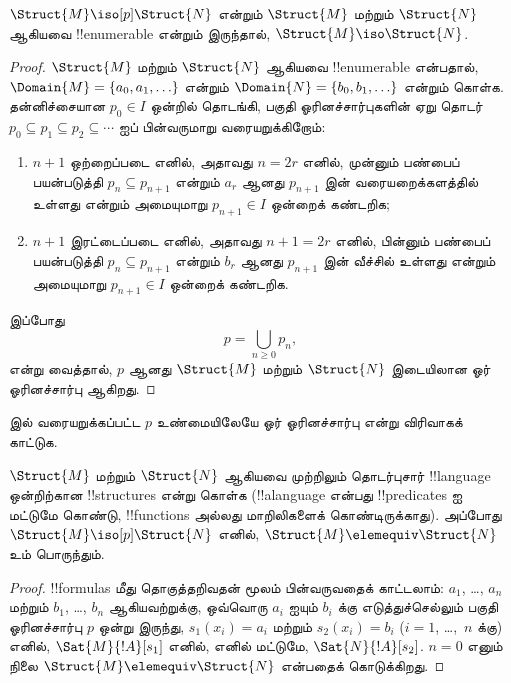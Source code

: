 \documentclass[../../../include/open-logic-section]{subfiles}
\begin{document}
\begin{thm}
  $\Struct{M} \iso[p] \Struct{N}$ என்றும் $\Struct{M}$ மற்றும்
  $\Struct{N}$ ஆகியவை !!{enumerable} என்றும் இருந்தால்,
  $\Struct{M} \iso
  \Struct{N}$.
\end{thm}

\begin{proof}
  $\Struct{M}$ மற்றும் $\Struct{N}$ ஆகியவை !!{enumerable} என்பதால்,
  $\Domain{M} =
  \{a_0, a_1, \ldots \}$ என்றும் $\Domain{N} = \{b_0, b_1, \ldots \}$
  என்றும் கொள்க. தன்னிச்சையான $p_0 \in I$ ஒன்றில் தொடங்கி, பகுதி
  ஓரினச்சார்புகளின் ஏறு தொடர் $p_0 \subseteq p_1 \subseteq p_2
  \subseteq \cdots$ ஐப் பின்வருமாறு வரையறுக்கிறோம்:
  \begin{enumerate}
  \item $n+1$ ஒற்றைப்படை எனில், அதாவது $n = 2r$ எனில், முன்னும்
    பண்பைப் பயன்படுத்தி $p_n \subseteq p_{n+1}$ என்றும் $a_r$ ஆனது
    $p_{n+1}$ இன் வரையறைக்களத்தில் உள்ளது என்றும் அமையுமாறு
    $p_{n+1} \in I$ ஒன்றைக் கண்டறிக;
  \item $n+1$ இரட்டைப்படை எனில், அதாவது $n+1 =2r$ எனில், பின்னும்
    பண்பைப் பயன்படுத்தி $p_n \subseteq p_{n+1}$ என்றும் $b_r$ ஆனது
    $p_{n+1}$ இன் வீச்சில் உள்ளது என்றும் அமையுமாறு $p_{n+1} \in I$
    ஒன்றைக் கண்டறிக.
  \end{enumerate}
இப்போது
\[
p = \bigcup_{n\ge 0} p_n,
\]
என்று வைத்தால், $p$ ஆனது $\Struct{M}$ மற்றும் $\Struct{N}$ இடையிலான
ஓர் ஓரினச்சார்பு ஆகிறது.
\end{proof}

\begin{prob}
   இல் வரையறுக்கப்பட்ட $p$
  உண்மையிலேயே ஓர் ஓரினச்சார்பு என்று விரிவாகக் காட்டுக.
\end{prob}

\begin{thm}
  $\Struct{M}$ மற்றும் $\Struct{N}$ ஆகியவை முற்றிலும் தொடர்புசார்
  !!{language} ஒன்றிற்கான !!{structure}s என்று கொள்க
  (!!a{language} என்பது !!{predicate}s ஐ மட்டுமே கொண்டு,
  !!{function}s அல்லது மாறிலிகளைக் கொண்டிருக்காது). அப்போது
  $\Struct{M} \iso[p] \Struct{N}$ எனில்,
  $\Struct{M} \elemequiv
  \Struct{N}$ உம் பொருந்தும்.
\end{thm}

\begin{proof}
  !!{formula}s மீது தொகுத்தறிவதன் மூலம் பின்வருவதைக் காட்டலாம்:
  $a_1$, \dots, $a_n$ மற்றும் $b_1$, \dots, $b_n$ ஆகியவற்றுக்கு,
  ஒவ்வொரு $a_i$ ஐயும் $b_i$ க்கு எடுத்துச்செல்லும் பகுதி
  ஓரினச்சார்பு $p$ ஒன்று இருந்து, $s_1(x_i) =a_i$ மற்றும்
  $s_2(x_i) =b_i$ ($i =1$, \dots,~$n$ க்கு) எனில்,
  $\Sat{M}{!A}[s_1]$ எனில், எனில் மட்டுமே,
  $\Sat{N}{!A}[s_2]$. $n=0$ எனும் நிலை
  $\Struct{M} \elemequiv \Struct{N}$ என்பதைக் கொடுக்கிறது.
\end{proof}
\end{document}
